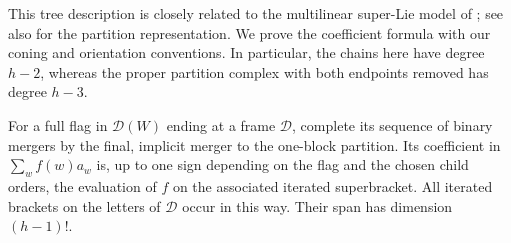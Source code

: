 This tree description is closely related to the multilinear
super-Lie model of \citet[Proposition~3.4, Corollary~3.5, and
Section~3.6]{Robinson2004}; see also
\citet[Theorem~7.3]{Stanley1982} for the partition representation.
We prove the coefficient formula with our coning and orientation
conventions. In particular, the chains here have degree $h-2$,
whereas the proper partition complex with both endpoints removed has
degree $h-3$.

\begin{lemma}\label{lem:merger-coefficients}
For a full flag in $\mathcal D(W)$ ending at a frame $\mathcal D$, complete its sequence of
binary mergers by the final, implicit merger to the one-block partition.
Its coefficient in $\sum_w f(w)a_w$ is, up to one sign depending on the
flag and the chosen child orders, the evaluation of $f$ on the associated
iterated superbracket.  All iterated brackets on the letters of
$\mathcal D$ occur in this way.  Their span has dimension $(h-1)!$.
\end{lemma}

